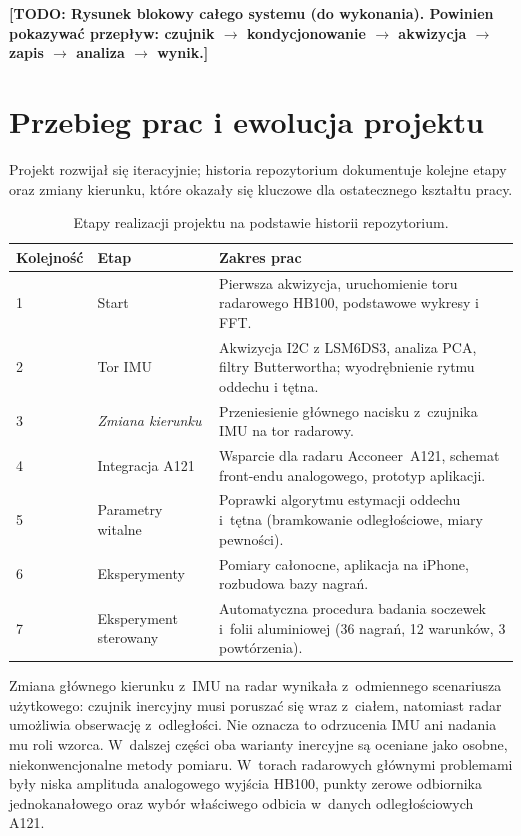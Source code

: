 \documentclass[12pt,a4paper,oneside]{report}
\newcommand{\todo}[1]{\textcolor{red!75!black}{\textbf{[TODO: #1]}}}
\newcommand{\miejsce}[1]{\todo{#1}}
\begin{document}
\miejsce{Rysunek blokowy całego systemu (do wykonania). Powinien pokazywać
przepływ: czujnik $\rightarrow$ kondycjonowanie $\rightarrow$ akwizycja
$\rightarrow$ zapis $\rightarrow$ analiza $\rightarrow$ wynik.}

\section{Przebieg prac i ewolucja projektu}
\label{sec:historia}

Projekt rozwijał się iteracyjnie; historia repozytorium dokumentuje kolejne
etapy oraz zmiany kierunku, które okazały się kluczowe dla ostatecznego
kształtu pracy.

\begin{table}[H]
\centering
\caption{Etapy realizacji projektu na podstawie historii repozytorium.}
\label{tab:historia}
\small
\begin{tabular}{@{}llp{7.6cm}@{}}
\toprule
Kolejność & Etap & Zakres prac \\
\midrule
1 & Start & Pierwsza akwizycja, uruchomienie toru radarowego HB100,
podstawowe wykresy i FFT. \\
2 & Tor IMU & Akwizycja I2C z LSM6DS3, analiza PCA, filtry
Butterwortha; wyodrębnienie rytmu oddechu i tętna. \\
3 & \emph{Zmiana kierunku} & Przeniesienie głównego nacisku
z~czujnika IMU na tor radarowy. \\
4 & Integracja A121 & Wsparcie dla radaru Acconeer~A121, schemat
front-endu analogowego, prototyp aplikacji. \\
5 & Parametry witalne & Poprawki algorytmu estymacji oddechu
i~tętna (bramkowanie odległościowe, miary pewności). \\
6 & Eksperymenty & Pomiary całonocne, aplikacja na iPhone, rozbudowa
bazy nagrań. \\
7 & Eksperyment sterowany & Automatyczna procedura badania soczewek
i~folii aluminiowej (36 nagrań, 12 warunków, 3 powtórzenia). \\
\bottomrule
\end{tabular}
\end{table}

Zmiana głównego kierunku z~IMU na radar wynikała z~odmiennego scenariusza
użytkowego: czujnik inercyjny musi poruszać się wraz z~ciałem, natomiast radar
umożliwia obserwację z~odległości. Nie oznacza to odrzucenia IMU ani nadania mu
roli wzorca. W~dalszej części oba warianty inercyjne są oceniane jako osobne,
niekonwencjonalne metody pomiaru. W~torach radarowych głównymi problemami były
niska amplituda analogowego wyjścia HB100, punkty zerowe odbiornika
jednokanałowego oraz wybór właściwego odbicia w~danych odległościowych A121.
\end{document}
